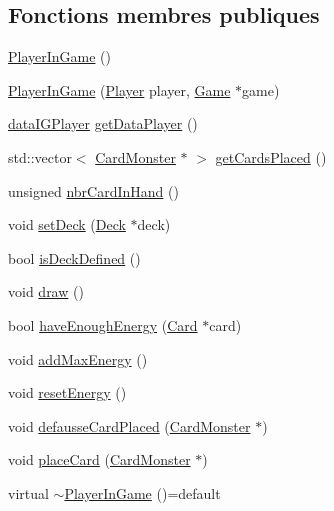 \subsection*{Fonctions membres publiques}
\begin{DoxyCompactItemize}
\item 
\hyperlink{classPlayerInGame_aef3887730c6e58e3ffa4b8636f5a1fd4}{Player\+In\+Game} ()
\item 
\hyperlink{classPlayerInGame_a64e5c60c2e6106c9dda8c7d79fc36d8b}{Player\+In\+Game} (\hyperlink{classPlayer}{Player} player, \hyperlink{classGame}{Game} $\ast$game)
\item 
\hyperlink{structdataIGPlayer}{data\+I\+G\+Player} \hyperlink{classPlayerInGame_addeeee2e42cf2009fc21511624414146}{get\+Data\+Player} ()
\item 
std\+::vector$<$ \hyperlink{classCardMonster}{Card\+Monster} $\ast$ $>$ \hyperlink{classPlayerInGame_a519fc525decf5af1217b93749cd9ae99}{get\+Cards\+Placed} ()
\item 
unsigned \hyperlink{classPlayerInGame_a9f8df0a2ef00955f318b41149f57fcb7}{nbr\+Card\+In\+Hand} ()
\item 
void \hyperlink{classPlayerInGame_a399370210526407c4234d19815a5fa44}{set\+Deck} (\hyperlink{classDeck}{Deck} $\ast$deck)
\item 
bool \hyperlink{classPlayerInGame_af4d06834c260aebb66c113f397ba3c86}{is\+Deck\+Defined} ()
\item 
void \hyperlink{classPlayerInGame_a646d88b36595c2754ce33555b867c012}{draw} ()
\item 
bool \hyperlink{classPlayerInGame_ac1629d9cadf7445be42eb3245daef6c4}{have\+Enough\+Energy} (\hyperlink{classCard}{Card} $\ast$card)
\item 
void \hyperlink{classPlayerInGame_aedc8c0d75e0d249fde42329dc0a59557}{add\+Max\+Energy} ()
\item 
void \hyperlink{classPlayerInGame_ad18e833fa982d9db29521b49c74b1fa0}{reset\+Energy} ()
\item 
void \hyperlink{classPlayerInGame_a86bc2f58c47405e97079425757cb3f62}{defausse\+Card\+Placed} (\hyperlink{classCardMonster}{Card\+Monster} $\ast$)
\item 
void \hyperlink{classPlayerInGame_a5588d4c494560f20b2d58953cf8ebc1c}{place\+Card} (\hyperlink{classCardMonster}{Card\+Monster} $\ast$)
\item 
virtual \hyperlink{classPlayerInGame_a75256787f26b0d264a929e61889caba1}{$\sim$\+Player\+In\+Game} ()=default
\end{DoxyCompactItemize}
